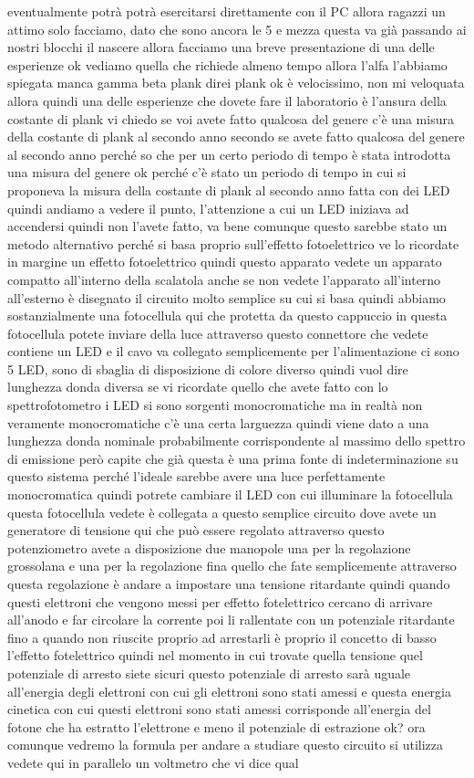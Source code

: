 eventualmente potrà potrà esercitarsi direttamente con il PC allora ragazzi un attimo solo facciamo, dato che sono ancora le 5 e mezza questa va già passando ai nostri blocchi il nascere allora facciamo una breve presentazione di una delle esperienze ok vediamo quella che richiede almeno tempo allora l'alfa l'abbiamo spiegata manca gamma beta plank direi plank ok è velocissimo, non mi veloquata allora quindi una delle esperienze che dovete fare il laboratorio è l'ansura della costante di plank vi chiedo se voi avete fatto qualcosa del genere c'è una misura della costante di plank al secondo anno secondo se avete fatto qualcosa del genere al secondo anno perché so che per un certo periodo di tempo è stata introdotta una misura del genere ok perché c'è stato un periodo di tempo in cui si proponeva la misura della costante di plank al secondo anno fatta con dei LED quindi andiamo a vedere il punto, l'attenzione a cui un LED iniziava ad accendersi quindi non l'avete fatto, va bene comunque questo sarebbe stato un metodo alternativo perché si basa proprio sull'effetto fotoelettrico ve lo ricordate in margine un effetto fotoelettrico quindi questo apparato vedete un apparato compatto all'interno della scalatola anche se non vedete l'apparato all'interno all'esterno è disegnato il circuito molto semplice su cui si basa quindi abbiamo sostanzialmente una fotocellula qui che protetta da questo cappuccio in questa fotocellula potete inviare della luce attraverso questo connettore che vedete contiene un LED e il cavo va collegato semplicemente per l'alimentazione ci sono 5 LED, sono di sbaglia di disposizione di colore diverso quindi vuol dire lunghezza donda diversa se vi ricordate quello che avete fatto con lo spettrofotometro i LED si sono sorgenti monocromatiche ma in realtà non veramente monocromatiche c'è una certa larguezza quindi viene dato a una lunghezza donda nominale probabilmente corrispondente al massimo dello spettro di emissione però capite che già questa è una prima fonte di indeterminazione su questo sistema perché l'ideale sarebbe avere una luce perfettamente monocromatica quindi potrete cambiare il LED con cui illuminare la fotocellula questa fotocellula vedete è collegata a questo semplice circuito dove avete un generatore di tensione qui che può essere regolato attraverso questo potenziometro avete a disposizione due manopole una per la regolazione grossolana e una per la regolazione fina quello che fate semplicemente attraverso questa regolazione è andare a impostare una tensione ritardante quindi quando questi elettroni che vengono messi per effetto fotelettrico cercano di arrivare all'anodo e far circolare la corrente poi li rallentate con un potenziale ritardante fino a quando non riuscite proprio ad arrestarli è proprio il concetto di basso l'effetto fotelettrico quindi nel momento in cui trovate quella tensione quel potenziale di arresto siete sicuri questo potenziale di arresto sarà uguale all'energia degli elettroni con cui gli elettroni sono stati amessi e questa energia cinetica con cui questi elettroni sono stati amessi corrisponde all'energia del fotone che ha estratto l'elettrone e meno il potenziale di estrazione ok? ora comunque vedremo la formula per andare a studiare questo circuito si utilizza vedete qui in parallelo un voltmetro che vi dice qual 